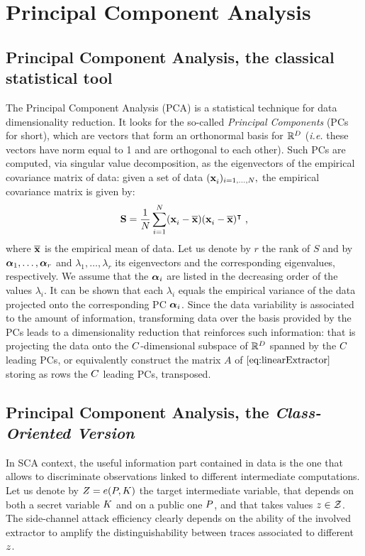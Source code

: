 \section{Principal Component Analysis}\label{sec:PCA}
%
%
\subsection{Principal Component Analysis, the classical statistical tool}
The Principal Component Analysis (PCA) \cite{fisher1938statistical} is a statistical technique for data dimensionality reduction. It looks for the so-called {\em Principal Components} (PCs for short), which are vectors that form an orthonormal basis for $\mathbb{R}^\traceLength$ (\textit{i.e.} these vectors have norm equal to 1 and are orthogonal to each other). Such PCs are computed, via singular value decomposition, as the eigenvectors of the empirical covariance matrix of data: given a set of data $(\sss[]{i})_{i=1,\dots,\numTraces[]},$ the empirical covariance matrix is given by:
\begin{equation}\label{eq:covmat}
\covmat = \frac{1}{\numTraces[]} \sum_{i=1}^{\numTraces[]}(\sss[]{i} - \mmmX)(\sss[]{i} - \mmmX)^\intercal \mbox{ ,}
\end{equation}
 where $\mmmX$ is the empirical mean of data. Let us denote by $r$ the rank of $S$ and by $\AAlpha_1, \dots, \AAlpha_r$ and $\lambda_1, \dots, \lambda_r$ its eigenvectors and the corresponding eigenvalues, respectively. We assume that the $\AAlpha_i$ are listed in the decreasing order of the values $\lambda_i$. It can be shown that each $\lambda_i$ equals the empirical variance of the data projected onto the corresponding PC $\AAlpha_i$. Since the data variability is associated to the amount of information, transforming data over the basis provided by the PCs leads to a dimensionality reduction that reinforces such information: that is projecting the data onto the  $\newTraceLength$-dimensional subspace of $\mathbb{R}^\traceLength$ spanned by the $\newTraceLength$ leading PCs, or equivalently construct the matrix $A$ of $\eqref{eq:linearExtractor}$ storing as rows the $\newTraceLength$ leading PCs, transposed.\\

\subsection{Principal Component Analysis, the {\em Class-Oriented Version}}\label{sec:PCA_classes}
In SCA context, the useful information part contained in data is the one that allows to discriminate observations linked to different intermediate computations. Let us denote by $\sensRandVar = \targetFunction(\randPlaintext,\randKey)$ the target intermediate variable, that depends on both a secret variable $\randKey$ and on a public one $\randPlaintext$, and that takes values $\sensVar \in \sensVarSet$. The side-channel attack efficiency clearly depends on the ability of the involved extractor to amplify the distinguishability between traces associated to different $\sensVar$.\\

